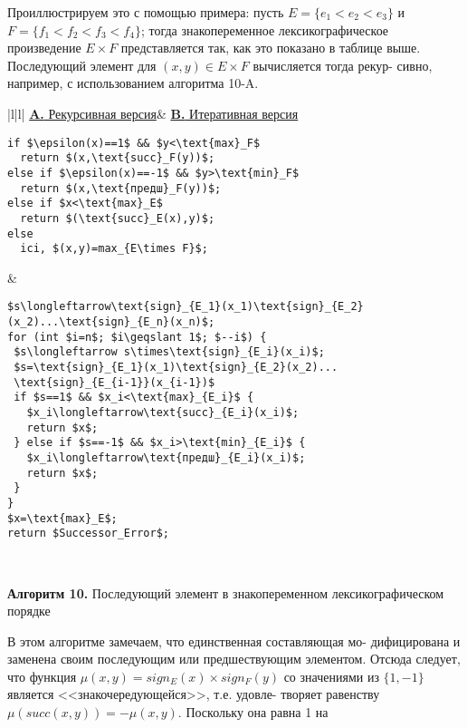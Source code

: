 \hspace*{15pt}Проиллюстрируем это с помощью примера: пусть $E=\{e_1<e_2<e_3\}$\linebreak
и $F=\{f_1<f_2<f_3<f_4\}$; тогда знакопеременное лексикографическое\linebreak
произведение $E\times F$ представляется так, как это показано в таблице\linebreak
выше.\newline
\hspace*{15pt}Последующий элемент для $(x,y)\in E\times F$ вычисляется тогда рекур-\linebreak
сивно, например, с использованием алгоритма 10-A.
\begin{center}
\begin{tabular}{|l|l|}
\hline
\hspace*{20pt}\underline{\textbf{A.} Рекурсивная версия}&
\hspace*{5pt}\underline{\textbf{B.} Итеративная версия}\\
{\begin{lstlisting}[mathescape=true, frame=none]
if $\epsilon(x)==1$ && $y<\text{max}_F$
  return $(x,\text{succ}_F(y))$;
else if $\epsilon(x)==-1$ && $y>\text{min}_F$
  return $(x,\text{предш}_F(y))$;
else if $x<\text{max}_E$
  return $(\text{succ}_E(x),y)$;
else
  ici, $(x,y)=max_{E\times F}$;
\end{lstlisting}}
&
{\begin{lstlisting}[mathescape=true, frame=none]
$s\longleftarrow\text{sign}_{E_1}(x_1)\text{sign}_{E_2}(x_2)...\text{sign}_{E_n}(x_n)$;
for (int $i=n$; $i\geqslant 1$; $--i$) {
 $s\longleftarrow s\times\text{sign}_{E_i}(x_i)$;
 $s=\text{sign}_{E_1}(x_1)\text{sign}_{E_2}(x_2)...
 \text{sign}_{E_{i-1}}(x_{i-1})$
 if $s==1$ && $x_i<\text{max}_{E_i}$ {
   $x_i\longleftarrow\text{succ}_{E_i}(x_i)$;
   return $x$;
 } else if $s==-1$ && $x_i>\text{min}_{E_i}$ {
   $x_i\longleftarrow\text{предш}_{E_i}(x_i)$;
   return $x$;
 }
}
$x=\text{max}_E$;
return $Successor_Error$;
\end{lstlisting}}\\
\hline
\end{tabular}
\end{center}
\begin{center}
\textbf{Алгоритм 10.} Последующий элемент в знакопеременном\newline
лексикографическом порядке
\end{center}
\hspace*{15pt}В этом алгоритме замечаем, что единственная составляющая мо-\linebreak
дифицирована и заменена своим последующим или предшествующим\linebreak
элементом. Отсюда следует, что функция $\mu(x,y)=sign_E(x)\times sign_F(y)$\linebreak
со значениями из $\{1, -1\}$ является <<знакочередующейся>>, т.е. удовле-\linebreak
творяет равенству $\mu(succ(x,y))=-\mu(x,y)$. Поскольку она равна 1 на\linebreak
\newpage



